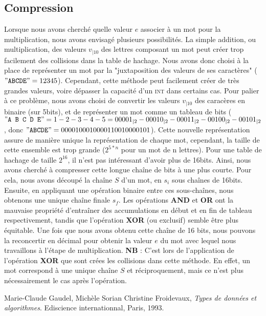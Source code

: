 \documentclass[final,twoside,article,10pt]{scrartcl}
\begin{document}
    \subsection{Compression}
    \label{sec:compression}
    Lorsque nous avons cherché quelle valeur $e$ associer à un mot pour la multiplication, nous avons envisagé plusieurs possibilités. La simple addition, ou multiplication, des valeurs $v_{|10}$ des lettres composant un mot peut créer trop facilement des collisions dans la table de hachage.
    Nous avons donc choisi à la place de représenter un mot par la "juxtaposition des valeurs de ses caractères" ($"\texttt{ABCDE}" = 12345$).
    Cependant, cette méthode peut facilement créer de très grandes valeurs, voire dépasser la capacité d'un \textsc{int} dans certains cas.
    Pour palier à ce problème, nous avons choisi de convertir les valeurs $v_{|10}$ des caracères en binaire (sur 5bits), et de représenter un mot comme un tableau de bits ($"\texttt{A B C D E}" = 1-2-3-4-5 = 00001_{|2}-00010_{|2}-00011_{|2}-00100_{|2}-00101_{|2}$, donc $"\texttt{ABCDE}" = 0000100010000110010000101$).
    Cette nouvelle représentation assure de manière unique la représentation de chaque mot, cependant, la taille de cette ensemble est trop grande ($2^{5*n}$ pour un mot de n lettres). 
    Pour une table de hachage de taille $2^{16}$, il n'est pas intéressant d'avoir plus de 16bits.
    Ainsi, nous avons cherché à compresser cette longue chaîne de bits à une plus courte.
    Pour cela, nous avons découpé la chaîne $S$ d'un mot, en $s_i$ sous chaînes de 16bits. Ensuite, en appliquant une opération binaire entre ces sous-chaînes, nous obtenons une unique chaîne finale $s_f$.
    Les opérations \textbf{AND} et \textbf{OR} ont la mauvaise propriété d'entraîner des accumulations en début et en fin de tableau respectivement, tandis que l'opération \textbf{XOR} (ou exclusif) semble être plus équitable.
    Une fois que nous avons obtenu cette chaîne de 16 bits, nous pouvons la reconcertir en décimal pour obtenir la valeur $e$ du mot avec lequel nous travaillons à l'étape de multiplication.\newline
    \medskip\newline
    \textbf{NB} : C'est lors de l'application de l'opération \textbf{XOR} que sont crées les collisions dans cette méthode. En effet, un mot correspond à une unique chaîne $S$ et réciproquement, mais ce n'est plus nécessairement le cas après l'opération.
    \begin{thebibliography}{9}
        Marie-Claude Gaudel, Michèle Sorian Christine Froidevaux, \emph{Types de données et algorithmes}. Ediscience internationnal, Paris, 1993.
\end{thebibliography}
\end{document}
